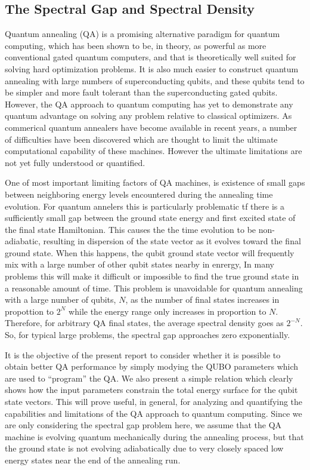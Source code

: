 \documentclass{article}
\begin{document}
\subsection*{The Spectral Gap and Spectral Density}

Quantum annealing (QA) is a promising alternative paradigm for quantum computing, which has been shown to be, in theory, as powerful as more conventional
gated quantum computers, and that is theoretically well suited for solving hard optimization problems. { }It is also much easier to construct quantum
annealing with large numbers of superconducting qubits, and these qubits tend to be simpler and more fault tolerant than the superconducting gated
qubits. { }However, the QA approach to quantum computing has yet to demonstrate any quantum advantage on solving any problem relative to classical
optimizers. { }As commerical quantum annealers have become available in recent years, a number of difficulties have been discovered which are thought
to limit the ultimate computational capability of these machines. { }However the ultimate limitations are not yet fully understood or quantified.


One of most important limiting factors of QA machines, is existence of { }small gaps between neighboring energy levels encountered during the annealing
time evolution. For quantum annelers this is particularly problematic tf there is a sufficiently small gap between the ground state energy and first
excited state of the final state Hamiltonian. { }This causes the the time evolution to be non-adiabatic, resulting in dispersion of the state vector
as it evolves toward the final ground state. When this happens, { }the qubit ground state vector { }will frequently mix with a large number of other
qubit states nearby in enrergy, { }In many problems this will make it difficult or impossible to find the true ground state in a reasonable amount
of time. This problem is unavoidable for quantum annealing with a large number of qubits, \(N\), as the number of final states increases in propottion
to \(2^N\) while the energy range only increases in proportion to \(N\). { }Therefore, for arbitrary QA final states, the average spectral density
goes as \(2^{-N}.\) { }So, for typical large problems, the spectral gap approaches zero exponentially.

It is the objective of the { }present report to consider whether it is possible to obtain better QA performance by simply modying the QUBO parameters
which are used to {``}program{''} the QA. { }We also present a simple relation which clearly shows how the input parameters constrain the total energy
surface for the qubit state vectors. { }This will prove useful, in general, for analyzing and quantifying the capabilities and limitations of the
QA approach to quantum computing. { }Since we are only considering the spectral gap problem here, we assume that the QA machine is evolving quantum
mechanically during the annealing process, but that the ground state is not evolving adiabatically due to very closely spaced low energy states near
the end of the annealing run. 
\end{document}
